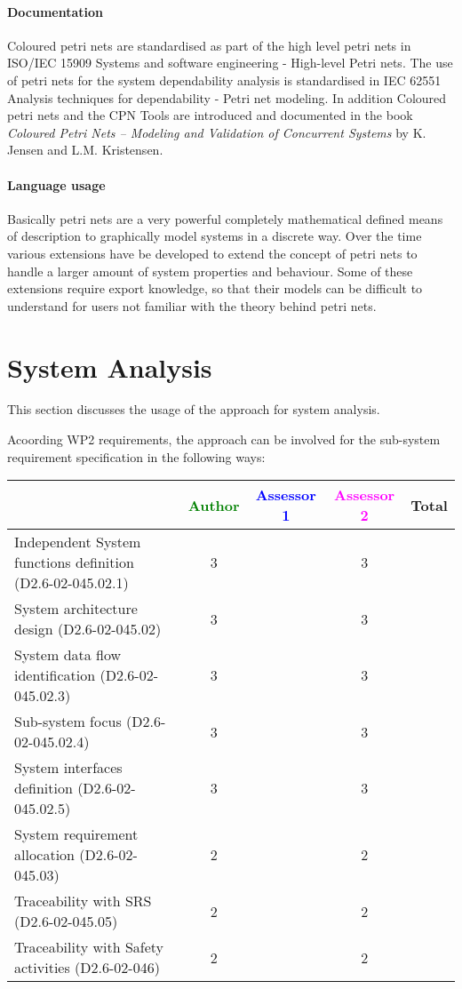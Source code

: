\paragraph{Documentation} Coloured petri nets are standardised as part of the high level petri nets in ISO/IEC 15909 Systems and software engineering - High-level Petri nets. The use of petri nets for the system dependability analysis is standardised in IEC 62551 Analysis techniques for dependability - Petri net modeling. In addition Coloured petri nets and the CPN Tools are introduced and documented in the book \textit{Coloured Petri Nets -- Modeling and Validation of Concurrent Systems} by K. Jensen and L.M. Kristensen. 

\paragraph{Language usage} Basically petri nets are a very powerful completely mathematical defined means of description to graphically model systems in a discrete way. Over the time various extensions have be developed to extend the concept of petri nets to handle a larger amount of system properties and  behaviour. Some of these extensions require export knowledge, so that their models can be difficult to understand for users not familiar with the theory behind petri nets.

\section{System Analysis}
This section discusses the usage of the approach for system analysis.

Acoording WP2 requirements, the approach can be involved for the sub-system requirement specification in the following ways:

\begin{tabular}{|l | c | c | c | c|}
\hline
& \textcolor{green}{Author} & \textcolor{blue}{Assessor 1} & \textcolor{magenta}{Assessor 2} & Total \\
\hline
Independent System functions definition (D2.6-02-045.02.1)  & 3 & & 3 &  \\
\hline 
System architecture design (D2.6-02-045.02) & 3 & & 3 &  \\
\hline
System data flow identification (D2.6-02-045.02.3)  & 3 & & 3 &  \\
\hline
Sub-system focus (D2.6-02-045.02.4)  & 3 & & 3 &  \\
\hline
System interfaces definition (D2.6-02-045.02.5)  & 3 & & 3 &  \\
\hline
System requirement allocation (D2.6-02-045.03)  & 2 & & 2 &  \\
\hline
Traceability with SRS (D2.6-02-045.05)  & 2 & & 2 &  \\
\hline
Traceability with Safety activities (D2.6-02-046)  & 2 & & 2 &  \\
\hline
\end{tabular}



